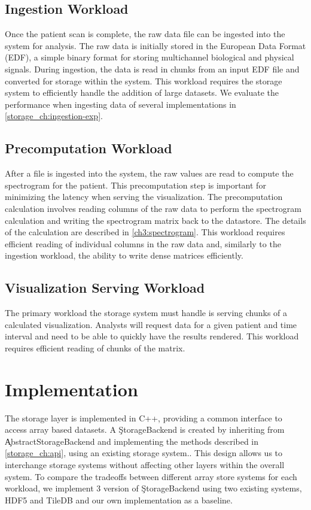 \subsection{Ingestion Workload}

Once the patient scan is complete, the raw data file can be ingested into the
system for analysis. The raw data is initially stored in the European Data
Format (EDF)\cite{edf}, a simple binary format for storing multichannel
biological and physical signals. During ingestion, the data is read in chunks
from an input EDF file and converted for storage within the system. This
workload requires the storage system to efficiently handle the addition of
large datasets. We evaluate the performance when ingesting data of several
implementations in \ref{storage_ch:ingestion-exp}.


\subsection{Precomputation Workload}

After a file is ingested into the system, the raw values are read to compute
the spectrogram for the patient. This precomputation step is important for
minimizing the latency when serving the visualization. The precomputation
calculation involves reading columns of the raw data to perform the spectrogram
calculation and writing the spectrogram matrix back to the datastore. The
details of the calculation are described in \ref{ch3:spectrogram}. This
workload requires efficient reading of individual columns in the raw data and,
similarly to the ingestion workload, the ability to write dense matrices
efficiently.

\subsection{Visualization Serving Workload}

The primary workload the storage system must handle is serving chunks of a
calculated visualization. Analysts will request data for a given patient and
time interval and need to be able to quickly have the results rendered. This
workload requires efficient reading of chunks of the matrix.

\section{Implementation}

The storage layer is implemented in C++, providing a common interface to access
array based datasets. A \c{StorageBackend} is created by inheriting from
\c{AbstractStorageBackend} and implementing the methods described in
\ref{storage_ch:api}, using an existing storage system.. This design allows us to
interchange storage systems without affecting other layers within the overall
system. To compare the tradeoffs between different array store systems for each
workload, we implement 3 version of \c{StorageBackend} using two existing
systems, HDF5 \cite{hdf5} and TileDB \cite{tiledb} and our own implementation
as a baseline.

